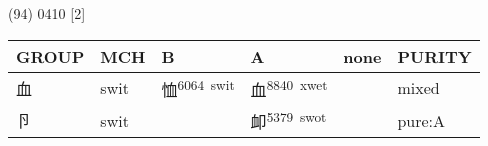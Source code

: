 \documentclass[14pt,a4paper]{scrartcl}
\begin{document}
(94) 0410 {[}2{]}

\begin{longtable}[c]{@{}llllll@{}}
\toprule
\begin{minipage}[b]{0.14\columnwidth}\raggedright\strut
GROUP
\strut\end{minipage} &
\begin{minipage}[b]{0.14\columnwidth}\raggedright\strut
MCH
\strut\end{minipage} &
\begin{minipage}[b]{0.14\columnwidth}\raggedright\strut
B
\strut\end{minipage} &
\begin{minipage}[b]{0.14\columnwidth}\raggedright\strut
A
\strut\end{minipage} &
\begin{minipage}[b]{0.14\columnwidth}\raggedright\strut
none
\strut\end{minipage} &
\begin{minipage}[b]{0.14\columnwidth}\raggedright\strut
PURITY
\strut\end{minipage}\tabularnewline
\midrule
\endhead
\begin{minipage}[t]{0.14\columnwidth}\raggedright\strut
血
\strut\end{minipage} &
\begin{minipage}[t]{0.14\columnwidth}\raggedright\strut
swit
\strut\end{minipage} &
\begin{minipage}[t]{0.14\columnwidth}\raggedright\strut
恤\textsuperscript{6064~swit}
\strut\end{minipage} &
\begin{minipage}[t]{0.14\columnwidth}\raggedright\strut
血\textsuperscript{8840~xwet}
\strut\end{minipage} &
\begin{minipage}[t]{0.14\columnwidth}\raggedright\strut
\strut\end{minipage} &
\begin{minipage}[t]{0.14\columnwidth}\raggedright\strut
mixed
\strut\end{minipage}\tabularnewline
\begin{minipage}[t]{0.14\columnwidth}\raggedright\strut
卪
\strut\end{minipage} &
\begin{minipage}[t]{0.14\columnwidth}\raggedright\strut
swit
\strut\end{minipage} &
\begin{minipage}[t]{0.14\columnwidth}\raggedright\strut
\strut\end{minipage} &
\begin{minipage}[t]{0.14\columnwidth}\raggedright\strut
卹\textsuperscript{5379~swot}
\strut\end{minipage} &
\begin{minipage}[t]{0.14\columnwidth}\raggedright\strut
\strut\end{minipage} &
\begin{minipage}[t]{0.14\columnwidth}\raggedright\strut
pure:A
\strut\end{minipage}\tabularnewline
\bottomrule
\end{longtable}
\end{document}
